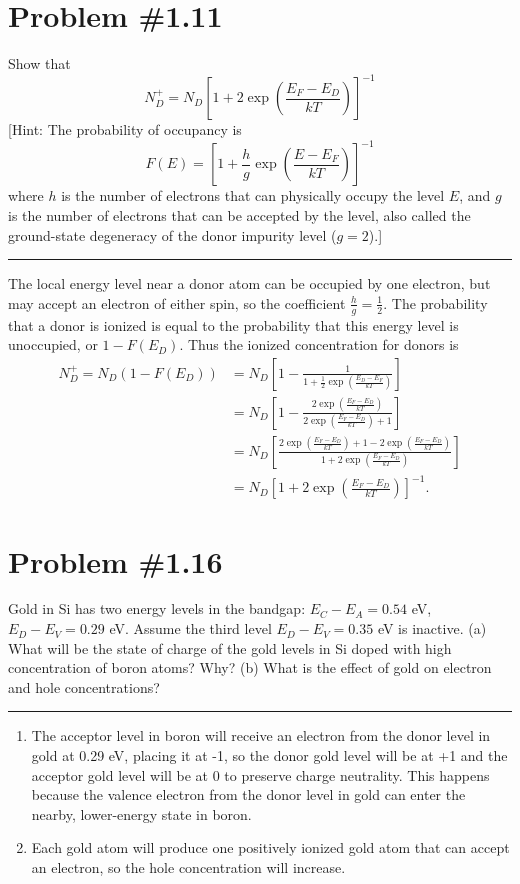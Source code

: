 \documentclass{article}
\newcommand{\horline}
           {\begin{center}
              \noindent\rule{8cm}{0.4pt}
            \end{center}}
\begin{document}
\section*{Problem \#1.11}
Show that
$$
N_{D}^{+} = N_D \left[1 + 2 \exp\left(\frac{E_F - E_D}{kT}\right)\right]^{-1}
$$
[Hint: The probability of occupancy is
$$
F(E) = \left[1 + \frac{h}{g} \exp\left(\frac{E - E_F}{kT}\right)\right]^{-1}
$$
where $h$ is the number of electrons that can physically occupy the level 
$E$, and $g$ is the number of electrons that can be accepted by the level,
also called the ground-state degeneracy of the donor impurity level ($g=2$).]
\horline
The local energy level near a donor atom can be occupied by one electron, but
may accept an electron of either spin, so the coefficient 
$\frac{h}{g} = \frac{1}{2}$. The probability that a donor is ionized is equal
to the probability that this energy level is unoccupied, or $1 - F(E_D)$. 
Thus the ionized concentration for donors is
\begin{align*}
  N_D^+ = N_D (1 - F(E_D)) 
  &= N_D\left[1 - 
     \frac{1}
          {1 + \frac{1}{2}\exp\left(\frac{E_D - E_F}{kT}\right)}\right] \\
  &= N_D\left[1 - \frac{2 \exp\left(\frac{E_F - E_D}{kT}\right)}
                       {2 \exp\left(\frac{E_F - E_D}{kT}\right) + 1}\right] \\
  &= N_D\left[\frac{2 \exp\left(\frac{E_F - E_D}{kT}\right) + 1 
                  - 2 \exp\left(\frac{E_F - E_D}{kT}\right)}
                   {1 + 2 \exp \left(\frac{E_F - E_D}{kT}\right)}\right] \\
  &= N_D\left[1 + 2 \exp \left(\frac{E_F - E_D}{kT}\right)\right]^{-1}.
\end{align*}


\section*{Problem \#1.16}
Gold in Si has two energy levels in the bandgap: $E_C - E_A = 0.54$ eV,
$E_D - E_V = 0.29$ eV. Assume the third level $E_D - E_V = 0.35$ eV is
inactive. (a) What will be the state of charge of the gold levels in Si
doped with high concentration of boron atoms? Why? (b) What is the effect
of gold on electron and hole concentrations?
\horline
\begin{enumerate}[label=(\Roman*)]
  \item{The acceptor level in boron will receive an electron from the donor
        level in gold at 0.29 eV, placing it at -1, so the donor gold level 
        will be at +1 and the acceptor gold level will be at 0 to preserve
        charge neutrality. This happens because the valence electron from the 
        donor level in gold can enter the nearby, lower-energy state in boron.
       }
  \item{Each gold atom will produce one positively ionized gold atom that can 
        accept an electron, so the hole concentration will increase.
       }
\end{enumerate}
\end{document}
